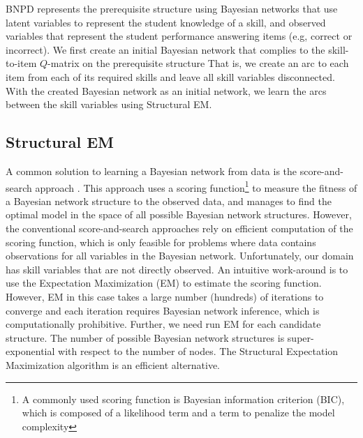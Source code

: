 \documentclass{edm_template}
\begin{document}
BNPD represents the prerequisite structure using Bayesian networks that use latent variables to represent the student knowledge of a skill, 
and observed variables that represent the student performance answering items (e.g, correct or incorrect).
We first create an initial Bayesian network that complies to the skill-to-item $Q$-matrix
on the prerequisite structure 
That is, we create an arc to each item from each of its required skills and leave all skill variables disconnected.
With the created Bayesian network as an initial network, we learn the arcs between the skill variables using Structural EM.

\subsection{Structural EM}

A common solution to learning a Bayesian network from data is the score-and-search approach \cite{cooper1992bayesian,heckerman1997bayesian}.
This approach uses a scoring function\footnote{A commonly used scoring function is Bayesian information criterion (BIC), which is composed of a likelihood term and a term to penalize the model complexity} to measure the fitness of a Bayesian network structure to the observed data, 
and manages to find the optimal model in the space of all possible Bayesian network structures.
However, the conventional score-and-search approaches rely on efficient computation of the scoring function, 
which is only feasible for problems where data contains observations for all variables in the Bayesian network.
Unfortunately, our domain has skill variables that are not directly observed.
An intuitive work-around is to use the Expectation Maximization (EM) to estimate the scoring function.
However, EM in this case takes a large number (hundreds) of iterations to converge and each iteration requires Bayesian network inference, 
which is computationally prohibitive.
Further, we need run EM for each candidate structure. The number of possible Bayesian network structures is super-exponential with respect to the number of nodes.
The Structural Expectation Maximization algorithm \cite{friedman1997learning,friedman1998bayesian} is an efficient alternative.
\end{document}
